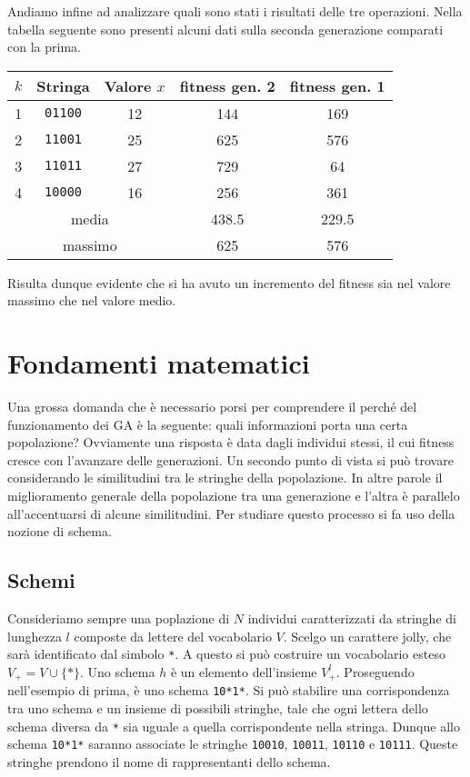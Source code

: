 \documentclass[a4paper, 11pt]{article}
\newcommand{\code}{\texttt}
\begin{document}
Andiamo infine ad analizzare quali sono stati i risultati delle tre operazioni.
Nella tabella seguente sono presenti alcuni dati sulla seconda generazione
comparati con la prima.
\begin{table}[h!]
\begin{tabular}{cccc|c}
\multicolumn{1}{c|}{$k$} & Stringa & Valore $x$ & fitness gen. 2 & fitness gen. 1 \\ \hline
\multicolumn{1}{c|}{1} & \code{01100} & 12 & 144 & 169 \\
\multicolumn{1}{c|}{2} & \code{11001} & 25 & 625 & 576 \\
\multicolumn{1}{c|}{3} & \code{11011} & 27 & 729 & 64 \\
\multicolumn{1}{c|}{4} & \code{10000} & 16 & 256 & 361 \\ \hline
\multicolumn{3}{c}{media} & 438.5 & 229.5 \\
\multicolumn{3}{c}{massimo} & 625 & 576
\end{tabular}
\end{table}

Risulta dunque evidente che si ha avuto un incremento del fitness sia nel valore
massimo che nel valore medio.




\section{Fondamenti matematici}

Una grossa domanda che è necessario porsi per comprendere il perché del
funzionamento dei GA è la seguente: quali informazioni porta una certa
popolazione? Ovviamente una risposta è data dagli individui stessi, il cui
fitness cresce con l'avanzare delle generazioni. Un secondo punto di vista si
può trovare considerando le similitudini tra le stringhe della popolazione. In
altre parole il miglioramento generale della popolazione tra una generazione e
l'altra è parallelo all'accentuarsi di alcune similitudini. Per studiare questo
processo si fa uso della nozione di schema.


\subsection{Schemi}

Consideriamo sempre una poplazione di $N$ individui caratterizzati da stringhe di
lunghezza $l$ composte da lettere del vocabolario $V$. Scelgo un carattere
jolly, che sarà identificato dal simbolo \code{*}. A questo si può costruire un
vocabolario esteso $V_+=V \cup \{\code{*}\}$. Uno schema $h$ è un elemento
dell'insieme $V_+^l$. Proseguendo nell'esempio di prima, è uno schema
\code{10*1*}. Si può stabilire una corrispondenza tra uno schema e un insieme
di possibili stringhe, tale che ogni lettera dello schema diversa da \code{*}
sia uguale a quella corrispondente nella stringa. Dunque allo schema
\code{10*1*} saranno associate le stringhe \code{10010}, \code{10011},
\code{10110} e \code{10111}. Queste stringhe prendono il nome di rappresentanti
dello schema.
\end{document}
